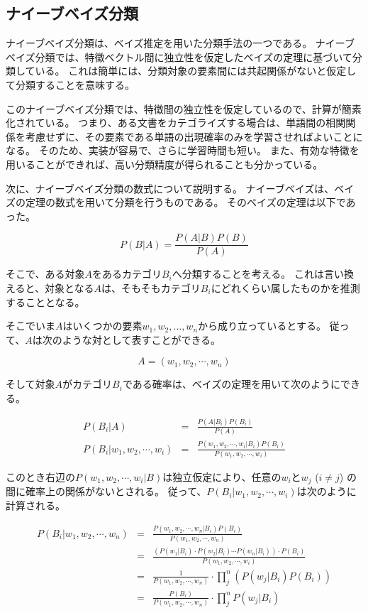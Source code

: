 \documentclass[11pt,a4j]{jsarticle}
\begin{document}
 \subsection{ナイーブベイズ分類}\label{sec:defnaivebayes}
ナイーブベイズ分類は、ベイズ推定を用いた分類手法の一つである。
ナイーブベイズ分類では、特徴ベクトル間に独立性を仮定したベイズの定理に基づいて分類している。
これは簡単には、分類対象の要素間には共起関係がないと仮定して分類することを意味する。

このナイーブベイズ分類では、特徴間の独立性を仮定しているので、計算が簡素化されている。
つまり、ある文書をカテゴライズする場合は、単語間の相関関係を考慮せずに、その要素である単語の出現確率のみを学習させればよいことになる。
そのため、実装が容易で、さらに学習時間も短い。
また、有効な特徴を用いることができれば、高い分類精度が得られることも分かっている。

次に、ナイーブベイズ分類の数式について説明する。
ナイーブベイズは、ベイズの定理の数式を用いて分類を行うものである。
そのベイズの定理は以下であった。

\begin{equation}
  P(B|A)=\frac{P(A|B)P(B)}{P(A)}
  \label{eq:nb}
\end{equation}

そこで、ある対象$A$をあるカテゴリ$B_i$へ分類することを考える。
これは言い換えると、対象となる$A$は、そもそもカテゴリ$B_i$にどれくらい属したものかを推測することとなる。

そこでいま$A$はいくつかの要素$w_1, w_2, \ldots, w_n$から成り立っているとする。
従って、$A$は次のような対として表すことができる。

\begin{equation}
  A = (w_1, w_2, \cdots ,w_n)
\end{equation}

そして対象$A$がカテゴリ$B_i$である確率は、ベイズの定理を用いて次のようにできる。

\begin{eqnarray}
  P(B_i|A) & = & \frac{P(A|B_i)P(B_i)}{P(A)} \\
  P(B_i|w_1, w_2, \cdots ,w_i) & = & \frac{P(w_1, w_2, \cdots ,w_i|B_i)P(B_i)}{P(w_1, w_2, \cdots ,w_i)}
\end{eqnarray}

このとき右辺の$P(w_1, w_2, \cdots ,w_i|B)$は独立仮定により、任意の$w_i$と$w_j$ ($i \not = j$) の間に確率上の関係がないとされる。
従って、$P(B_i|w_1, w_2, \cdots ,w_i)$は次のように計算される。

\begin{eqnarray}
  P(B_i|w_1, w_2, \cdots ,w_n) & = & \frac{P(w_1, w_2, \cdots ,w_n|B_i)P(B_i)}{P(w_1, w_2, \cdots ,w_n)}\\
  & = & \frac{(P(w_1|B_i) \cdot P(w_2|B_i) \cdots P(w_n|B_i)) \cdot P(B_i)}{P(w_1, w_2, \cdots ,w_i)}\\
  & = & \frac{1}{P(w_1, w_2, \cdots ,w_n)} \cdot \prod_{j}^{n}(P(w_j|B_i)P(B_i)) \\
  & = & \frac{P(B_i)}{P(w_1, w_2, \cdots ,w_n)} \cdot \prod_{j}^{n} P(w_j|B_i)
\end{eqnarray}
\end{document}

